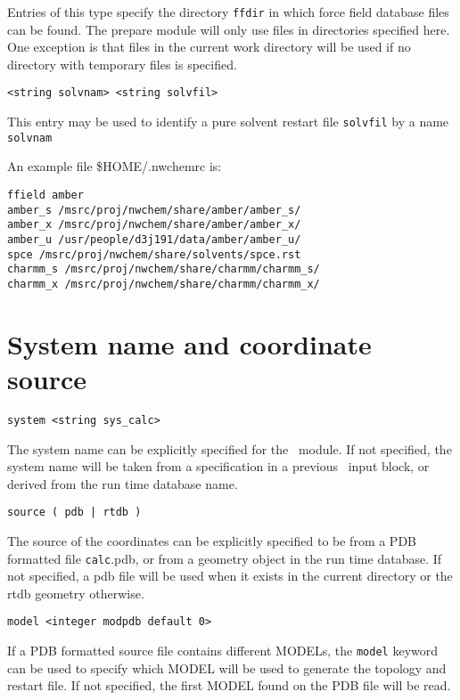 Entries of this type specify the directory \verb+ffdir+ in which force field 
database files can be found. 
The prepare module will only use files in directories
specified here. One exception is that files in the current work directory
will be used if no directory with temporary files is specified.

\begin{verbatim}
<string solvnam> <string solvfil>
\end{verbatim}

This entry may be used to identify a pure solvent restart file \verb+solvfil+
by a name \verb+solvnam+

An example file \$HOME/.nwchemrc is:

\begin{verbatim}
ffield amber
amber_s /msrc/proj/nwchem/share/amber/amber_s/
amber_x /msrc/proj/nwchem/share/amber/amber_x/
amber_u /usr/people/d3j191/data/amber/amber_u/
spce /msrc/proj/nwchem/share/solvents/spce.rst
charmm_s /msrc/proj/nwchem/share/charmm/charmm_s/
charmm_x /msrc/proj/nwchem/share/charmm/charmm_x/
\end{verbatim}

\section{System name and coordinate source}

\begin{verbatim}
system <string sys_calc>
\end{verbatim}

The system name can be explicitly specified for the \prepare\ module.
If not specified, the system name will be taken from a specification
in a previous \md\ input block, or derived from the run time database
name.

\begin{verbatim}
source ( pdb | rtdb )
\end{verbatim}

The source of the coordinates can be explicitly specified to be from
a PDB formatted file \verb+calc+.pdb, or from a geometry object in the run
time database. If not specified, a pdb file will be used when it exists
in the current directory or the rtdb geometry otherwise.

\begin{verbatim}
model <integer modpdb default 0>
\end{verbatim}

If a PDB formatted source file contains different MODELs, the \verb+model+
keyword can be used to specify which MODEL will be used to generate the
topology and restart file. If not specified, the first MODEL found on the
PDB file will be read.

